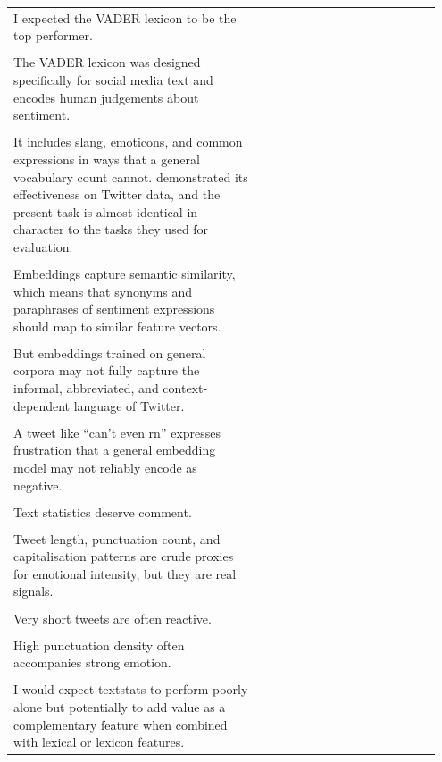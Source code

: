 \documentclass[11pt]{article}
\begin{document}
\begin{longtable}{|p{0.55\linewidth}|p{0.40\linewidth}|}
\hline
\rule{0pt}{3.5cm} & \\
\hline
I expected the VADER lexicon to be the top performer. & \\[2pt]
\hline
\rule{0pt}{3.5cm} & \\
\hline
The VADER lexicon was designed specifically for social media text and encodes human judgements about sentiment. & \\[2pt]
\hline
\rule{0pt}{3.5cm} & \\
\hline
It includes slang, emoticons, and common expressions in ways that a general vocabulary count cannot. demonstrated its effectiveness on Twitter data, and the present task is almost identical in character to the tasks they used for evaluation. & \\[2pt]
\hline
\rule{0pt}{3.5cm} & \\
\hline
Embeddings capture semantic similarity, which means that synonyms and paraphrases of sentiment expressions should map to similar feature vectors. & \\[2pt]
\hline
\rule{0pt}{3.5cm} & \\
\hline
But embeddings trained on general corpora may not fully capture the informal, abbreviated, and context-dependent language of Twitter. & \\[2pt]
\hline
\rule{0pt}{3.5cm} & \\
\hline
A tweet like ``can't even rn'' expresses frustration that a general embedding model may not reliably encode as negative. & \\[2pt]
\hline
\rule{0pt}{3.5cm} & \\
\hline
Text statistics deserve comment. & \\[2pt]
\hline
\rule{0pt}{3.5cm} & \\
\hline
Tweet length, punctuation count, and capitalisation patterns are crude proxies for emotional intensity, but they are real signals. & \\[2pt]
\hline
\rule{0pt}{3.5cm} & \\
\hline
Very short tweets are often reactive. & \\[2pt]
\hline
\rule{0pt}{3.5cm} & \\
\hline
High punctuation density often accompanies strong emotion. & \\[2pt]
\hline
\rule{0pt}{3.5cm} & \\
\hline
I would expect textstats to perform poorly alone but potentially to add value as a complementary feature when combined with lexical or lexicon features. & \\[2pt]

\end{longtable}
\end{document}
